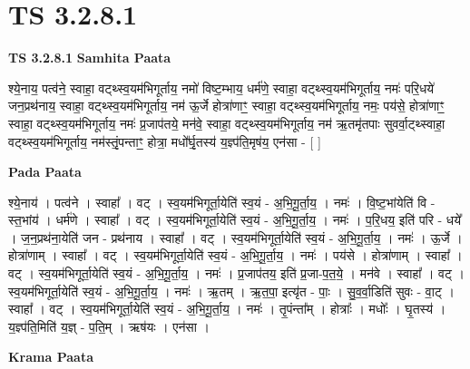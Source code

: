 \documentclass[17pt]{extarticle}
\begin{document}
\section{ TS 3.2.8.1 }

\textbf{TS 3.2.8.1 } \newline
\textbf{Samhita Paata} \newline

श्ये॒नाय॒ पत्व॑ने॒ स्वाहा॒ वट्थ्स्व॒यम॑भिगूर्ताय॒ नमो॑ विष्ट॒म्भाय॒ धर्म॑णे॒ स्वाहा॒ वट्थ्स्व॒यम॑भिगूर्ताय॒ नमः॑ परि॒धये॑ जन॒प्रथ॑नाय॒ स्वाहा॒ वट्थ्स्व॒यम॑भिगूर्ताय॒ नम॑ ऊ॒र्जे होत्रा॑णाꣳ॒॒ स्वाहा॒ वट्थ्स्व॒यम॑भिगूर्ताय॒ नमः॒ पय॑से॒ होत्रा॑णाꣳ॒॒ स्वाहा॒ वट्थ्स्व॒यम॑भिगूर्ताय॒ नमः॑ प्र॒जाप॑तये॒ मन॑वे॒ स्वाहा॒ वट्थ्स्व॒यम॑भिगूर्ताय॒ नम॑ ऋ॒तमृ॑तपाः सुवर्वा॒ट्थ्स्वाहा॒ वट्थ्स्व॒यम॑भिगूर्ताय॒ नम॑स्तृं॒पन्ताꣳ॒॒ होत्रा॒ मधो᳚र्घृ॒तस्य॑ य॒ज्ञ्प॑ति॒मृष॑य॒ एन॑सा - [  ] \newline

\textbf{Pada Paata} \newline

श्ये॒नाय॑ । पत्व॑ने । स्वाहा᳚ । वट् । स्व॒यम॑भिगूर्ता॒येति॑ स्व॒यं - अ॒भि॒गू॒र्ता॒य॒ । नमः॑ । वि॒ष्ट॒भांयेति॑ वि - स्त॒भांय॑ । धर्म॑णे । स्वाहा᳚ । वट् । स्व॒यम॑भिगूर्ता॒येति॑ स्व॒यं - अ॒भि॒गू॒र्ता॒य॒ । नमः॑ । प॒रि॒धय॒ इति॑ परि - धये᳚ । ज॒न॒प्रथ॑ना॒येति॑ जन - प्रथ॑नाय । स्वाहा᳚ । वट् । स्व॒यम॑भिगूर्ता॒येति॑ स्व॒यं - अ॒भि॒गू॒र्ता॒य॒ । नमः॑ । ऊ॒र्जे । होत्रा॑णाम् । स्वाहा᳚ । वट् । स्व॒यम॑भिगूर्ता॒येति॑ स्व॒यं - अ॒भि॒गू॒र्ता॒य॒ । नमः॑ । पय॑से । होत्रा॑णाम् । स्वाहा᳚ । वट् । स्व॒यम॑भिगूर्ता॒येति॑ स्व॒यं - अ॒भि॒गू॒र्ता॒य॒ । नमः॑ । प्र॒जाप॑तय॒ इति॑ प्र॒जा-प॒त॒ये॒ । मन॑वे । स्वाहा᳚ । वट् । स्व॒यम॑भिगूर्ता॒येति॑ स्व॒यं - अ॒भि॒गू॒र्ता॒य॒ । नमः॑ । ऋ॒तम् । ऋ॒त॒पा॒ इत्यृ॑त - पाः॒ । सु॒व॒र्वा॒डिति॑ सुवः - वा॒ट् । स्वाहा᳚ । वट् । स्व॒यम॑भिगूर्ता॒येति॑ स्व॒यं - अ॒भि॒गू॒र्ता॒य॒ । नमः॑ । तृ॒पंन्ता᳚म् । होत्राः᳚ । मधोः᳚ । घृ॒तस्य॑ । य॒ज्ञ्प॑ति॒मिति॑ य॒ज्ञ् - प॒ति॒म् । ऋष॑यः । एन॑सा ।  \newline


\textbf{Krama Paata} \newline
\end{document}
